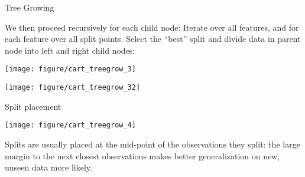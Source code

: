 \documentclass[11pt,compress,t,notes=noshow, xcolor=table]{beamer}
\newenvironment{knitrout}{}{} %
\begin{document}
\begin{vbframe}{Tree Growing}
\framebreak

We then proceed recursively for each child node:
Iterate over all features, and for each feature over all split points. Select the \enquote{best} split and divide data in parent node into left and right child nodes:
\begin{knitrout}\scriptsize
{}\color{fgcolor}

{\centering \texttt{[image: figure/cart\_treegrow\_3]}

}




{\centering \texttt{[image: figure/cart\_treegrow\_32]} 

}



\end{knitrout}

\end{vbframe}

\begin{vbframe}{Split placement}
\begin{knitrout}\scriptsize
{}\color{fgcolor}

{\centering \texttt{[image: figure/cart\_treegrow\_4]}

}



\end{knitrout}
\lz
Splits are usually placed at the mid-point of the observations they split: the large margin to the next closest observations makes better generalization on new, unseen data more likely.
\end{vbframe}
\end{document}
